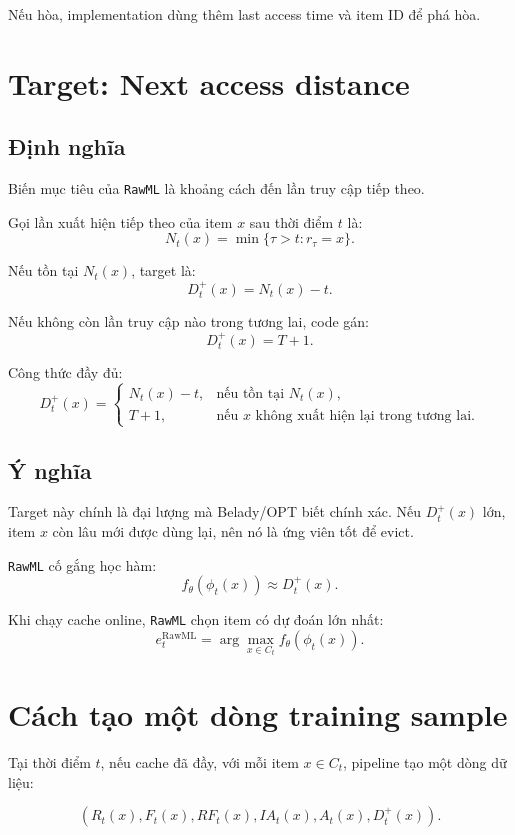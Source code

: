 \documentclass[11pt,a4paper]{article}
\newcommand{\code}[1]{\texttt{#1}}
\begin{document}
Nếu hòa, implementation dùng thêm last access time và item ID để phá hòa.

\section{Target: Next access distance}

\subsection{Định nghĩa}

Biến mục tiêu của \code{RawML} là khoảng cách đến lần truy cập tiếp theo.

Gọi lần xuất hiện tiếp theo của item \(x\) sau thời điểm \(t\) là:
\[
    N_t(x)
    =
    \min\{\tau>t : r_{\tau}=x\}.
\]

Nếu tồn tại \(N_t(x)\), target là:
\[
    D_t^+(x)
    =
    N_t(x)-t.
\]

Nếu không còn lần truy cập nào trong tương lai, code gán:
\[
    D_t^+(x)=T+1.
\]

Công thức đầy đủ:
\[
    D_t^+(x)
    =
    \begin{cases}
        N_t(x)-t, & \text{nếu tồn tại } N_t(x),\\
        T+1, & \text{nếu } x \text{ không xuất hiện lại trong tương lai}.
    \end{cases}
\]

\subsection{Ý nghĩa}

Target này chính là đại lượng mà Belady/OPT biết chính xác. Nếu \(D_t^+(x)\) lớn, item \(x\) còn lâu mới được dùng lại, nên nó là ứng viên tốt để evict.

\code{RawML} cố gắng học hàm:
\[
    f_{\theta}(\phi_t(x))
    \approx
    D_t^+(x).
\]

Khi chạy cache online, \code{RawML} chọn item có dự đoán lớn nhất:
\[
    e_t^{\mathrm{RawML}}
    =
    \arg\max_{x\in C_t}
    f_{\theta}(\phi_t(x)).
\]

\section{Cách tạo một dòng training sample}

Tại thời điểm \(t\), nếu cache đã đầy, với mỗi item \(x\in C_t\), pipeline tạo một dòng dữ liệu:

\[
    \left(
    R_t(x),
    F_t(x),
    RF_t(x),
    IA_t(x),
    A_t(x),
    D_t^+(x)
    \right).
\]
\end{document}
